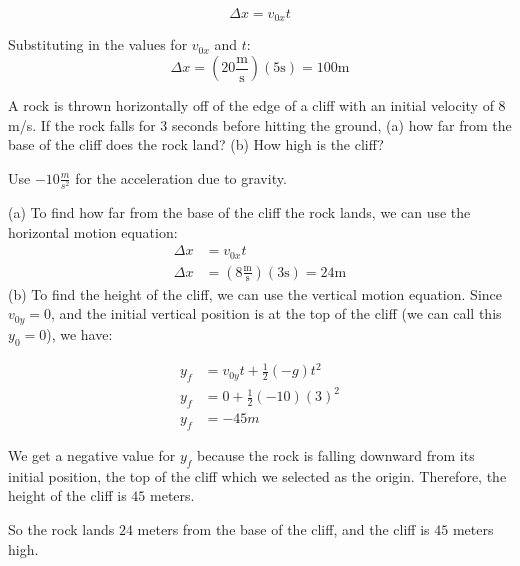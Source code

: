 \[
\Delta x = v_{0x} t
\]

Substituting in the values for $v_{0x}$ and $t$:
\[
\Delta x = (20 \frac{\text{m}}{\text{s}}) (5 \text{s}) = 100 \text{m}
\]

\begin{Exercise}[title=Horizontally-launched Projectile, label=projectiles_horiz1]
A rock is thrown horizontally off of the edge of a cliff with an initial velocity of $8$ m/s. If the rock falls for $3$ seconds before hitting the ground, (a) how far from the base of the cliff does the rock land? (b) How high is the cliff? 

Use $-10 \frac{m}{s^2}$ for the acceleration due to gravity.
\end{Exercise}

\begin{Answer}[ref=projectiles_horiz1]
(a) To find how far from the base of the cliff the rock lands, we can use the horizontal motion equation:
\begin{align*}
    \Delta x &= v_{0x} t\\
    \Delta x &= (8 \tfrac{\text{m}}{\text{s}})(3 \text{s}) = 24 \text{m}
\end{align*}
(b) To find the height of the cliff, we can use the vertical motion equation. Since $v_{0y} = 0$, and the initial vertical position is at the top of the cliff (we can call this $y_0 = 0$), we have:

\begin{align*}
    y_f &= v_{0y} t + \frac{1}{2} (-g) t^2 \\
    y_f &= 0 + \frac{1}{2} (-10) (3)^{2} \\
    y_f &= -45 m
\end{align*}

We get a negative value for $y_f$ because the rock is falling downward from its initial position, the top of the cliff which we selected as the origin. Therefore, the height of the cliff is $45$ meters.

So the rock lands $24$ meters from the base of the cliff, and the cliff is $45$ meters high.

\end{Answer}

